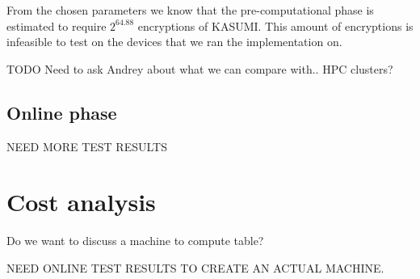 From the chosen parameters we know that the pre-computational phase is
estimated to require $2^{64.88}$ encryptions of KASUMI. This amount of encryptions
is infeasible to test on the devices that we ran the
 implementation on.

TODO Need to ask Andrey about what we can compare with.. HPC clusters?

\subsection{Online phase}

NEED MORE TEST RESULTS

\section{Cost analysis}

Do we want to discuss a machine to compute table?

NEED ONLINE TEST RESULTS TO CREATE AN ACTUAL MACHINE.
